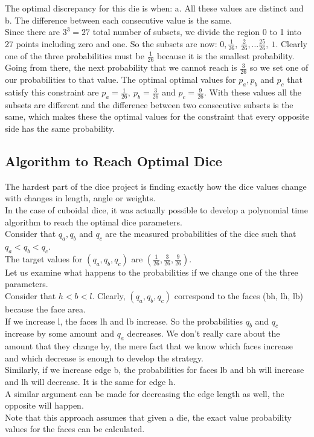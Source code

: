 The optimal discrepancy for this die is when: a. All these values are distinct and b. The difference between each consecutive value is the same.\\
Since there are $3^3 = 27$ total number of subsets, we divide the region 0 to 1 into 27 points including zero and one. So the subsets are now: $0, \frac{1}{26},\ \frac{2}{26}, \ldots \frac{25}{26},\ 1$. Clearly one of the three probabilities must be $\frac{1}{26}$ because it is the smallest probability. Going from there, the next probability that we cannot reach is $\frac{3}{26}$ so we set one of our probabilities to that value. The optimal optimal values for $p_a, p_b$ and $p_c$ that satisfy this constraint are $p_a = \frac{1}{26},\ p_b = \frac{3}{26}$ and $p_c = \frac{9}{26}$. With these values all the subsets are different and the difference between two consecutive subsets is the same, which makes these the optimal values for the constraint that every opposite side has the same probability.\\

\subsection{Algorithm to Reach Optimal Dice}
The hardest part of the dice project is finding exactly how the dice values change with changes in length, angle or weights.\\
In the case of cuboidal dice, it was actually possible to develop a polynomial time algorithm to reach the optimal dice parameters.\\

Consider that $q_a, q_b$ and $q_c$ are the measured probabilities of the dice such that $q_a < q_b < q_c$.\\
The target values for $(q_a, q_b, q_c)$ are $(\frac{1}{26}, \frac{3}{26}, \frac{9}{26})$.\\
Let us examine what happens to the probabilities if we change one of the three parameters.\\
Consider that $h < b < l$. Clearly, $(q_a, q_b, q_c)$ correspond to the faces (bh, lh, lb) because the face area.\\
If we increase l, the faces lh and lb increase. So the probabilities $q_b$ and $q_c$ increase by some amount and $q_a$ decreases. We don't really care about the amount that they change by, the mere fact that we know which faces increase and which decrease is enough to develop the strategy.\\
Similarly, if we increase edge b, the probabilities for faces lb and bh will increase and lh will decrease. It is the same for edge h.\\
A similar argument can be made for decreasing the edge length as well, the opposite will happen.\\
Note that this approach assumes that given a die, the exact value probability values for the faces can be calculated.\\

